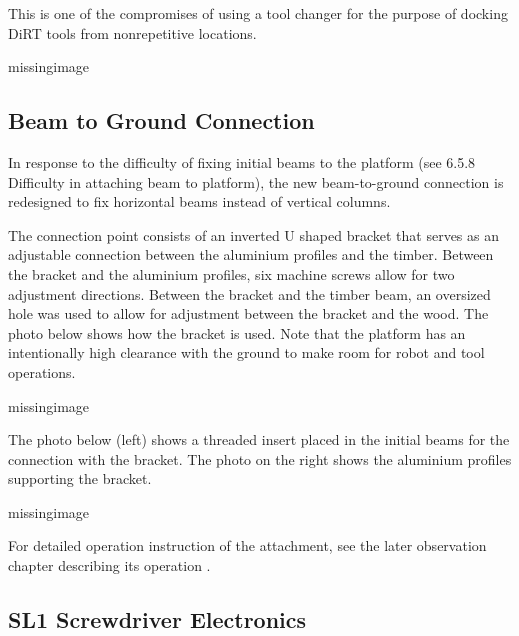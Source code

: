 This is one of the compromises of using a tool changer for the purpose of docking DiRT tools from nonrepetitive locations. 

missingimage

\subsection{Beam to Ground Connection}
\label{subsection:exploration_4_beam_to_ground_connection}

In response to the difficulty of fixing initial beams to the platform (see 6.5.8 Difficulty in attaching beam to platform), the new beam-to-ground connection is redesigned to fix horizontal beams instead of vertical columns. 

The connection point consists of an inverted U shaped bracket that serves as an adjustable connection between the aluminium profiles and the timber. Between the bracket and the aluminium profiles, six machine screws allow for two adjustment directions. Between the bracket and the timber beam, an oversized hole was used to allow for adjustment between the bracket and the wood. The photo below shows how the bracket is used. Note that the platform has an intentionally high clearance with the ground to make room for robot and tool operations.

missingimage

The photo below (left) shows a threaded insert placed in the initial beams for the connection with the bracket. The photo on the right shows the aluminium profiles supporting the bracket.

missingimage

For detailed operation instruction of the attachment, see the later observation chapter describing its operation .

\subsection{SL1 Screwdriver Electronics}
\label{subsection:exploration_4_sl1_screwdriver_electronics}

